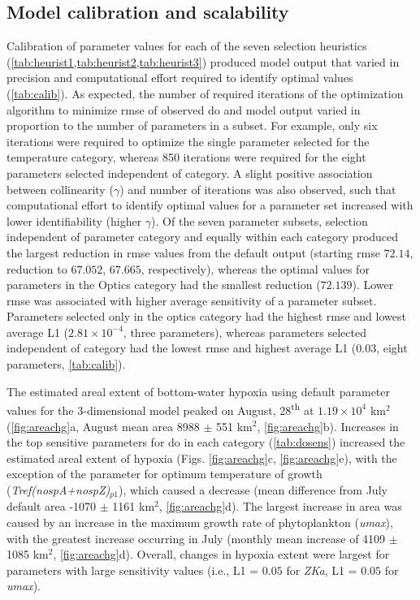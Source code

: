 \documentclass[preprint]{elsarticle}\usepackage[]{graphicx}\usepackage[]{color}
\begin{document}
\subsection{Model calibration and scalability}



Calibration of parameter values for each of the seven selection heuristics (\cref{tab:heurist1,tab:heurist2,tab:heurist3})  produced model output that varied in precision and computational effort required to identify optimal values (\cref{tab:calib}).  As expected, the number of required iterations of the optimization algorithm to minimize \ac{rmse} of observed \ac{do} and model output varied in proportion to the number of parameters in a subset.  For example, only six iterations were required to optimize the single parameter selected for the temperature category, whereas 850 iterations were required for the eight parameters selected independent of category.  A slight positive association between collinearity ($\gamma$) and number of iterations was also observed, such that computational effort  to identify optimal values for a parameter set increased with lower identifiability (higher $\gamma$).  Of the seven parameter subsets, selection independent of parameter category and equally within each category produced the largest reduction in \ac{rmse} values from the default output (starting \ac{rmse} $72.14$, reduction to $67.052$, $67.665$, respectively), whereas the optimal values for parameters in the Optics category had the smallest reduction ($72.139$).  Lower \ac{rmse} was associated with higher average sensitivity of a parameter subset.  Parameters selected only in the optics category had the highest \ac{rmse} and lowest average L1 ($2.81\times 10^{-4}$, three parameters), whereas parameters selected independent of category had the lowest \ac{rmse} and highest average L1 ($0.03$, eight parameters, \cref{tab:calib}). 



The estimated areal extent of bottom-water hypoxia using default parameter values for the 3-dimensional model peaked on August, 28\textsuperscript{th} at $1.19\times 10^{4}$ km$^2$ (\cref{fig:areachg}a, August mean area 8988 $\pm$ 551 km$^2$, \cref{fig:areachg}b). Increases in the top sensitive parameters for \ac{do} in each category (\cref{tab:dosens}) increased the estimated areal extent of hypoxia (Figs. \ref{fig:areachg}c, \ref{fig:areachg}e), with the exception of the parameter for optimum temperature of growth (\textit{Tref(nospA+nospZ)$_{p1}$}), which caused a decrease (mean difference from July default area -1070 $\pm$ 1161 km$^2$, \cref{fig:areachg}d).  The largest increase in area was caused by an increase in the maximum growth rate of phytoplankton (\textit{umax}), with the greatest increase occurring in July (monthly mean increase of 4109 $\pm$ 1085 km$^2$, \cref{fig:areachg}d).  Overall, changes in hypoxia extent were largest for parameters with large sensitivity values (i.e., L1 = $0.05$ for \textit{ZKa}, L1 = $0.05$ for \textit{umax}).
\end{document}
